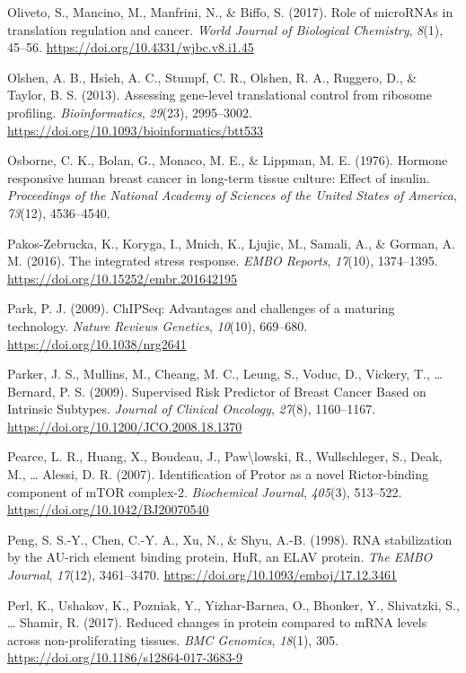 \documentclass[12pt,openany]{book}
\begin{document}
\hypertarget{ref-Oliveto2017}{}
Oliveto, S., Mancino, M., Manfrini, N., \& Biffo, S. (2017). Role of
microRNAs in translation regulation and cancer. \emph{World Journal of
Biological Chemistry}, \emph{8}(1), 45--56.
\url{https://doi.org/10.4331/wjbc.v8.i1.45}

\hypertarget{ref-Olshen2013}{}
Olshen, A. B., Hsieh, A. C., Stumpf, C. R., Olshen, R. A., Ruggero, D.,
\& Taylor, B. S. (2013). Assessing gene-level translational control from
ribosome profiling. \emph{Bioinformatics}, \emph{29}(23), 2995--3002.
\url{https://doi.org/10.1093/bioinformatics/btt533}

\hypertarget{ref-Osborne1976}{}
Osborne, C. K., Bolan, G., Monaco, M. E., \& Lippman, M. E. (1976).
Hormone responsive human breast cancer in long-term tissue culture:
Effect of insulin. \emph{Proceedings of the National Academy of Sciences
of the United States of America}, \emph{73}(12), 4536--4540.

\hypertarget{ref-Pakos-Zebrucka2016}{}
Pakos-Zebrucka, K., Koryga, I., Mnich, K., Ljujic, M., Samali, A., \&
Gorman, A. M. (2016). The integrated stress response. \emph{EMBO
Reports}, \emph{17}(10), 1374--1395.
\url{https://doi.org/10.15252/embr.201642195}

\hypertarget{ref-Park2009}{}
Park, P. J. (2009). ChIPSeq: Advantages and challenges of a maturing
technology. \emph{Nature Reviews Genetics}, \emph{10}(10), 669--680.
\url{https://doi.org/10.1038/nrg2641}

\hypertarget{ref-Parker2009}{}
Parker, J. S., Mullins, M., Cheang, M. C., Leung, S., Voduc, D.,
Vickery, T., \ldots{} Bernard, P. S. (2009). Supervised Risk Predictor
of Breast Cancer Based on Intrinsic Subtypes. \emph{Journal of Clinical
Oncology}, \emph{27}(8), 1160--1167.
\url{https://doi.org/10.1200/JCO.2008.18.1370}

\hypertarget{ref-Pearce2007}{}
Pearce, L. R., Huang, X., Boudeau, J., Paw\textbackslash{}lowski, R.,
Wullschleger, S., Deak, M., \ldots{} Alessi, D. R. (2007).
Identification of Protor as a novel Rictor-binding component of mTOR
complex-2. \emph{Biochemical Journal}, \emph{405}(3), 513--522.
\url{https://doi.org/10.1042/BJ20070540}

\hypertarget{ref-Peng1998}{}
Peng, S. S.-Y., Chen, C.-Y. A., Xu, N., \& Shyu, A.-B. (1998). RNA
stabilization by the AU-rich element binding protein, HuR, an ELAV
protein. \emph{The EMBO Journal}, \emph{17}(12), 3461--3470.
\url{https://doi.org/10.1093/emboj/17.12.3461}

\hypertarget{ref-Perl2017}{}
Perl, K., Ushakov, K., Pozniak, Y., Yizhar-Barnea, O., Bhonker, Y.,
Shivatzki, S., \ldots{} Shamir, R. (2017). Reduced changes in protein
compared to mRNA levels across non-proliferating tissues. \emph{BMC
Genomics}, \emph{18}(1), 305.
\url{https://doi.org/10.1186/s12864-017-3683-9}
\end{document}
